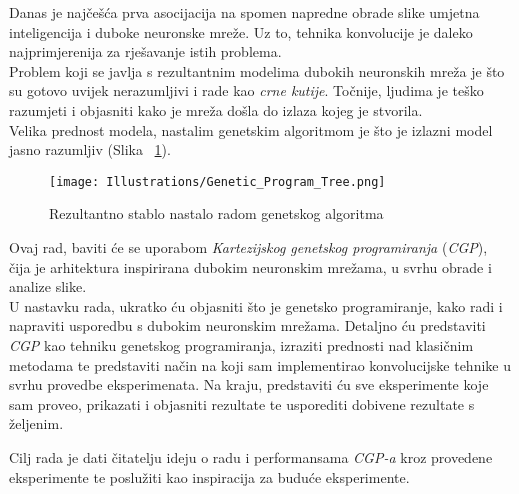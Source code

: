 Danas je najčešća prva asocijacija na spomen napredne obrade slike umjetna inteligencija i duboke neuronske mreže.
Uz to, tehnika konvolucije je daleko najprimjerenija za rješavanje istih problema. \\
Problem koji se javlja s rezultantnim modelima dubokih neuronskih mreža je što su gotovo uvijek nerazumljivi i rade kao \emph{crne kutije}.
Točnije, ljudima je teško razumjeti i objasniti kako je mreža došla do izlaza kojeg je stvorila. \\
Velika prednost modela, nastalim genetskim algoritmom je što je izlazni model jasno razumljiv (Slika ~\ref{fig:gen_alg_tree_1}).

\begin{figure}
	\centering
	\texttt{[image: Illustrations/Genetic\_Program\_Tree.png]}
	\caption{Rezultantno stablo nastalo radom genetskog algoritma}
	\label{fig:gen_alg_tree_1}
\end{figure}

Ovaj rad, baviti će se uporabom \emph{Kartezijskog genetskog programiranja} (\emph{CGP}), čija je arhitektura inspirirana dubokim neuronskim mrežama, u svrhu obrade i analize slike. \\
U nastavku rada, ukratko ću objasniti što je genetsko programiranje, kako radi i napraviti usporedbu s dubokim neuronskim mrežama.
Detaljno ću predstaviti \emph{CGP} kao tehniku genetskog programiranja, izraziti prednosti nad klasičnim metodama te predstaviti način na koji sam implementirao konvolucijske tehnike u svrhu provedbe eksperimenata.
Na kraju, predstaviti ću sve eksperimente koje sam proveo, prikazati i objasniti rezultate te usporediti dobivene rezultate s željenim.

Cilj rada je dati čitatelju ideju o radu i performansama \emph{CGP-a} kroz provedene eksperimente te poslužiti kao inspiracija za buduće eksperimente.
